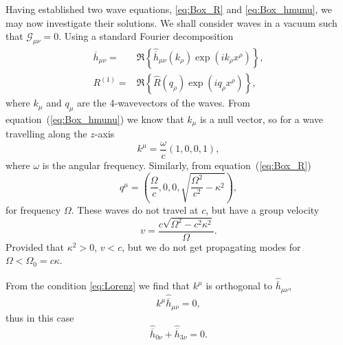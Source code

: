 \documentclass[a4paper, 11pt, titlepage, twoside]{report}
\newcommand{\eqnref}[1]{equation~(\ref{eq:#1})}
\begin{document}
Having established two wave equations, \eqref{eq:Box_R} and \eqref{eq:Box_hmunu}, we may now investigate their solutions. We shall consider waves in a vacuum such that $\mathcal{G}_{\mu\nu} = 0$. Using a standard Fourier decomposition
\begin{align}
\overline{h}_{\mu\nu} = {} & \Re\left\{\widehat{\overline{h}}_{\mu\nu}(k_\rho) \exp\left(ik_\rho x^\rho\right)\right\},\\
R^{(1)} = {} & \Re\left\{\widehat{R}(q_\rho) \exp\left(iq_\rho x^\rho\right)\right\},
\end{align}
where $k_\mu$ and $q_\mu$ are the 4-wavevectors of the waves. From \eqnref{Box_hmunu} we know that $k_\mu$ is a null vector, so for a wave travelling along the $z$-axis
\begin{equation}
k^\mu = \frac{\omega}{c}(1, 0, 0, 1),
\end{equation}
where $\omega$ is the angular frequency. Similarly, from \eqnref{Box_R}
\begin{equation}
q^\mu = \left(\frac{\Omega}{c}, 0, 0, \sqrt{\frac{\Omega^2}{c^2} - \kappa^2}\right),
\label{eq:Ricci_q}
\end{equation}
for frequency $\Omega$. These waves do not travel at $c$, but have a group velocity
\begin{equation}
v = \frac{c\sqrt{\Omega^2 - c^2\kappa^2}}{\Omega}.
\end{equation}
Provided that $\kappa^2 > 0$, $v < c$, but we do not get propagating modes for $\Omega < \Omega_0 = c\kappa$.

From the condition \eqref{eq:Lorenz} we find that $k^\mu$ is orthogonal to $\widehat{\overline{h}}_{\mu\nu}$,
\begin{equation}
k^\mu\widehat{\overline{h}}_{\mu\nu} = 0,
\end{equation}
thus in this case
\begin{equation}
\widehat{\overline{h}}_{0\nu} + \widehat{\overline{h}}_{3\nu} = 0.
\label{eq:Transverse}
\end{equation}
\end{document}
